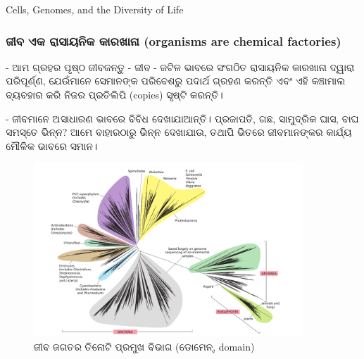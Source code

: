 \documentclass{beamer}
\begin{document}
\begin{frame}
    \begin{center}
        \color{Orange}\Huge Cells, Genomes, and the Diversity of Life \\
        \vspace{0.5cm}
    \end{center}
\end{frame}

\begin{frame}
    \frametitle{\color{Orange}\oriyafont ଜୀବ ଏକ ରାସାୟନିକ କାରଖାନା (organisms are chemical factories)}


- \color{Blue}{\oriyafont  ନିଜର ପ୍ରତିଲିପି (copies) ସୃଷ୍ଟି:} \color{Black} \oriyafont ଆମ ଗ୍ରହର ପୃଷ୍ଠ ଜୀବଜନ୍ତୁ - ଜୀବ - ଜଟିଳ ଭାବରେ ସଂଗଠିତ ରାସାୟନିକ କାରଖାନା ଦ୍ୱାରା ପରିପୂର୍ଣ୍ଣ, ଯେଉଁମାନେ ସେମାନଙ୍କ ପରିବେଶରୁ ପଦାର୍ଥ ଗ୍ରହଣ କରନ୍ତି ଏବଂ ଏହି କଞ୍ଚାମାଲ ବ୍ୟବହାର କରି ନିଜର ପ୍ରତିଲିପି (copies) ସୃଷ୍ଟି କରନ୍ତି।

- \color{Blue}{\oriyafont ଆମେ ବାହାରକୁ ଦେଖିଲେ ସମସ୍ତେ ଭିନ୍ନ। } \color{Black} \oriyafont ଜୀବମାନେ ଅସାଧାରଣ ଭାବରେ ବିବିଧ ଦେଖାଯାଆନ୍ତି। ପ୍ରଜାପତି, ଗଛ, ସାମୁଦ୍ରିକ ଘାସ, ବାଘ ସମସ୍ତେ ଭିନ୍ନ? ଆମେ ବାହାରଠାରୁ ଭିନ୍ନ ଦେଖାଯାଉ, ତଥାପି ଭିତରେ ଜୀବମାନଙ୍କର କାର୍ଯ୍ୟ ମୌଳିକ ଭାବରେ ସମାନ।

\end{frame}

\begin{figure}[h!]
    \centering
    \includegraphics[width=0.9\textwidth]{domains.png} %
    \caption{\oriyafont ଜୀବ ଜଗତର ତିନୋଟି ପ୍ରମୁଖ ବିଭାଗ (ଡୋମେନ୍, domain)}
    \label{fig:sample-image}
\end{figure}
\end{document}
